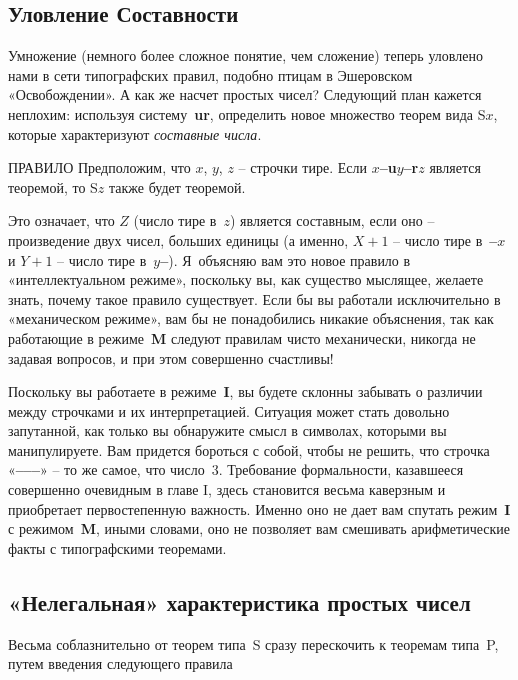 \documentclass[../main.tex]{subfiles}
\begin{document}
\subsection{Уловление Составности}

Умножение (немного более сложное понятие, чем сложение) теперь уловлено нами в сети типографских правил, подобно птицам в Эшеровском «Освобождении». А как же насчет простых чисел? Следующий план кажется неплохим: используя систему~\textbf{ur}, определить новое множество теорем вида S$x$, которые характеризуют \emph{составные числа}.

\begin{mybox}{ПРАВИЛО}
    Предположим, что $x$, $y$, $z$ \--- строчки тире.
    Если \textbf{$x$--u$y$--r$z$} является теоремой, то S$z$ также будет теоремой.
\end{mybox}

Это означает, что $Z$ (число тире в~$z$) является составным, если оно \--- произведение двух чисел, больших единицы (а именно, $X + 1$ \--- число тире в~\textbf{--$x$} и $Y + 1$ \--- число тире в~\textbf{$y$--}). Я~объясняю вам это новое правило в «интеллектуальном режиме», поскольку вы, как существо мыслящее, желаете знать, почему такое правило существует. Если бы вы работали исключительно в «механическом режиме», вам бы не понадобились никакие объяснения, так как работающие в режиме~\textbf{M} следуют правилам чисто механически, никогда не задавая вопросов, и при этом совершенно счастливы!

Поскольку вы работаете в режиме~\textbf{I}, вы будете склонны забывать о различии между строчками и их интерпретацией. Ситуация может стать довольно запутанной, как только вы обнаружите смысл в символах, которыми вы манипулируете. Вам придется бороться с собой, чтобы не решить, что строчка «\textbf{--{}--{}--}» \--- то же самое, что число~3.
Требование формальности, казавшееся совершенно очевидным в главе I, здесь становится весьма каверзным и приобретает первостепенную важность. Именно оно не дает вам спутать режим~\textbf{I} с режимом~\textbf{M}, иными словами, оно не позволяет вам смешивать арифметические факты с типографскими теоремами.


\subsection{«Нелегальная» характеристика простых чисел}

Весьма соблазнительно от теорем типа~S сразу перескочить к теоремам типа~P, путем введения следующего правила
\end{document}
